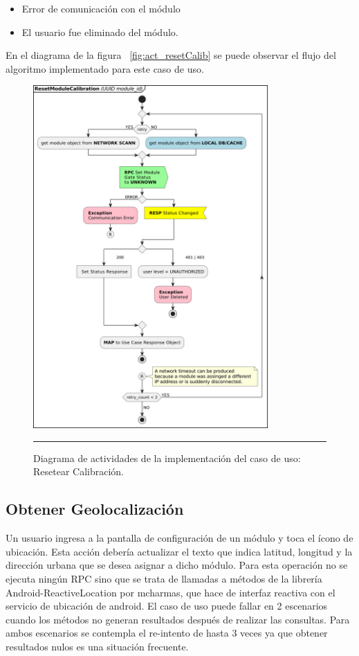 \begin{itemize}
	\item Error de comunicación con el módulo
	\item El usuario fue eliminado del módulo.
\end{itemize}

En el diagrama de la figura ~\ref{fig:act_resetCalib} se puede observar el flujo del algoritmo implementado para este caso de uso.
\begin{figure}[htbp]
	\centering
	\includegraphics[width=0.8\textwidth]{Figures/iter2/ACT_resetCalib.png}
	\rule{35em}{1pt}
	\caption[Class Diagram]{Diagrama de actividades de la implementación del caso de uso: Resetear Calibración.}
	\label{fig:act_act_resetCalib}
\end{figure}

\subsection{Obtener Geolocalización}
Un usuario ingresa a la pantalla de configuración de un módulo y toca el ícono de ubicación.
Esta acción debería actualizar el texto que indica latitud, longitud y la dirección urbana que se desea asignar a dicho módulo.
Para esta operación no se ejecuta ningún RPC sino que se trata de llamadas a métodos de la librería Android-ReactiveLocation por mcharmas, que hace de interfaz reactiva con el servicio de ubicación de android.
El caso de uso puede fallar en 2 escenarios cuando los métodos no generan resultados después de realizar las consultas.
Para ambos escenarios se contempla el re-intento de hasta 3 veces ya que obtener resultados nulos es una situación frecuente.

